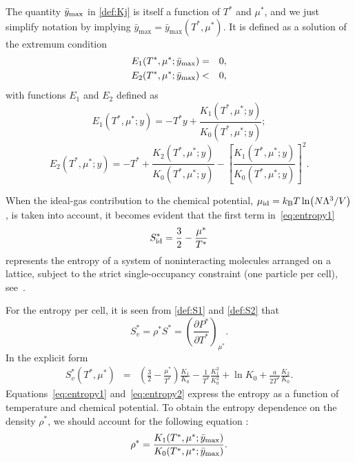 \documentclass[entropy,article,submit,pdftex,moreauthors]{Definitions/mdpi}
\begin{document}
The quantity $\bar{y}_{\rm max}$ in \eqref{def:Kj} is itself a function of $T^*$ and $\mu^*$, and we just simplify notation by implying $\bar{y}_{\mathrm{max}} = \bar{y}_{\mathrm{max}}(T^*,\mu^*)$. It is defined as a solution of the extremum condition
\begin{eqnarray}
	\label{cond:max}
	E_1(T^*,\mu^*; \bar{y}_{\rm max}) & = & 0,
	\nonumber\\
	E_2(T^*,\mu^*;\bar{y}_{\rm max}) & < & 0,
\end{eqnarray}
with functions $E_1$ and $E_2$ defined as
\begin{equation}
	\label{def:E1}
	E_1(T^*,\mu^*;y) = -T^* y + \frac{K_1(T^*,\mu^*;y)}{K_0(T^*,\mu^*;y)};
\end{equation}
\begin{equation}
	E_2(T^*,\mu^*;y) = -T^*+\frac{K_2(T^*,\mu^*;y)}{K_0(T^*,\mu^*;y)}
	-\left[\frac{K_1(T^*,\mu^*;y)}{K_0(T^*,\mu^*;y)}\right]^2\!.
\end{equation}

When the ideal-gas contribution to the chemical potential, $\mu_{\rm{id}} = k_{\rm{B}}T \ln(N\Lambda^3/V)$, is taken into account, it becomes evident that the first term in~\eqref{eq:entropy1} 
\begin{equation}
	S^*_{\rm id} = \frac{3}{2} - \frac{\mu^*}{T^*}
\end{equation}
represents the entropy of a system of noninteracting molecules arranged on a lattice, subject to the strict single-occupancy constraint (one particle per cell), see~\citep[(47.4)]{Hill56}.

For the entropy per cell, it is seen from \eqref{def:S1} and \eqref{def:S2} that
\begin{equation}
	S^*_v = \rho^* S^* = \left(\frac{\partial P^*}{\partial T^*}\right)_{\mu^*}.
\end{equation}
In the explicit form
\begin{eqnarray}
	\label{eq:entropy2}
	S^{*}_v(T^*,\mu^*) & = & \left(\frac{3}{2} - \frac{\mu^*}{T^*}\right)\frac{K_1}{K_0} - \frac{1}{T^*}\frac{K_1^2}{K_0^2} + \ln K_0 + \frac{a}{2T^*} \frac{K_2}{K_0}.
\end{eqnarray}
Equations~\eqref{eq:entropy1} and~\eqref{eq:entropy2} express the entropy as a function of temperature and chemical potential. To obtain the entropy dependence on the density $\rho^*$, we should account for the following equation \citep[(42)]{RDKPS25arxiv}:
\begin{equation}
	\label{eq:rho_in_y}
	\rho^*=\frac{K_1(T^*,\mu^*;\bar{y}_{\rm max})}{K_0(T^*,\mu^*;\bar{y}_{\rm max})}.
\end{equation}
\end{document}
